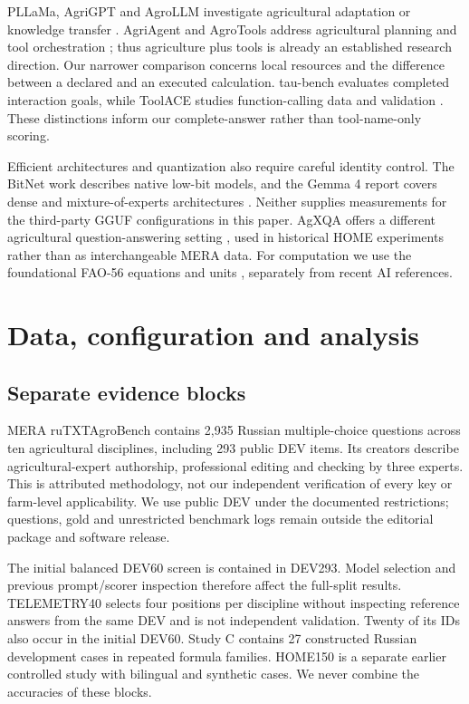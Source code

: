 \documentclass[10pt,a4paper]{article}
\begin{document}
PLLaMa, AgriGPT and AgroLLM investigate agricultural adaptation or knowledge transfer \cite{ref9,ref10,ref11}. AgriAgent and AgroTools address agricultural planning and tool orchestration \cite{ref12,ref13}; thus agriculture plus tools is already an established research direction. Our narrower comparison concerns local resources and the difference between a declared and an executed calculation. tau-bench evaluates completed interaction goals, while ToolACE studies function-calling data and validation \cite{ref14,ref15}. These distinctions inform our complete-answer rather than tool-name-only scoring.


Efficient architectures and quantization also require careful identity control. The BitNet work describes native low-bit models, and the Gemma 4 report covers dense and mixture-of-experts architectures \cite{ref16,ref17}. Neither supplies measurements for the third-party GGUF configurations in this paper. AgXQA offers a different agricultural question-answering setting \cite{ref18}, used in historical HOME experiments rather than as interchangeable MERA data. For computation we use the foundational FAO-56 equations and units \cite{ref19}, separately from recent AI references.


\section{Data, configuration and analysis}

\subsection*{Separate evidence blocks}

MERA ruTXTAgroBench contains 2,935 Russian multiple-choice questions across ten agricultural disciplines, including 293 public DEV items. Its creators describe agricultural-expert authorship, professional editing and checking by three experts. This is attributed methodology, not our independent verification of every key or farm-level applicability. We use public DEV under the documented restrictions; questions, gold and unrestricted benchmark logs remain outside the editorial package and software release.


The initial balanced DEV60 screen is contained in DEV293. Model selection and previous prompt/scorer inspection therefore affect the full-split results. TELEMETRY40 selects four positions per discipline without inspecting reference answers from the same DEV and is not independent validation. Twenty of its IDs also occur in the initial DEV60. Study C contains 27 constructed Russian development cases in repeated formula families. HOME150 is a separate earlier controlled study with bilingual and synthetic cases. We never combine the accuracies of these blocks.
\end{document}
